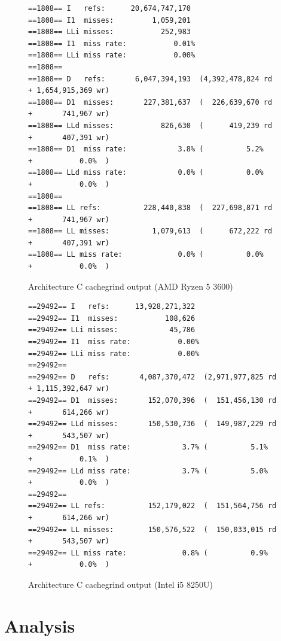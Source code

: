 \documentclass{article}
\begin{document}
\begin{figure}[!h]
\centering
\begin{BVerbatim}
==1808== I   refs:      20,674,747,170
==1808== I1  misses:         1,059,201
==1808== LLi misses:           252,983
==1808== I1  miss rate:           0.01%
==1808== LLi miss rate:           0.00%
==1808== 
==1808== D   refs:       6,047,394,193  (4,392,478,824 rd   + 1,654,915,369 wr)
==1808== D1  misses:       227,381,637  (  226,639,670 rd   +       741,967 wr)
==1808== LLd misses:           826,630  (      419,239 rd   +       407,391 wr)
==1808== D1  miss rate:            3.8% (          5.2%     +           0.0%  )
==1808== LLd miss rate:            0.0% (          0.0%     +           0.0%  )
==1808== 
==1808== LL refs:          228,440,838  (  227,698,871 rd   +       741,967 wr)
==1808== LL misses:          1,079,613  (      672,222 rd   +       407,391 wr)
==1808== LL miss rate:             0.0% (          0.0%     +           0.0%  )
\end{BVerbatim}
\caption{Architecture C cachegrind output (AMD Ryzen 5 3600)}
\label{arch_c_cachegrind_pc}
\end{figure}

\begin{figure}[!h]
\centering
\begin{BVerbatim}
==29492== I   refs:      13,928,271,322
==29492== I1  misses:           108,626
==29492== LLi misses:            45,786
==29492== I1  miss rate:           0.00%
==29492== LLi miss rate:           0.00%
==29492== 
==29492== D   refs:       4,087,370,472  (2,971,977,825 rd   + 1,115,392,647 wr)
==29492== D1  misses:       152,070,396  (  151,456,130 rd   +       614,266 wr)
==29492== LLd misses:       150,530,736  (  149,987,229 rd   +       543,507 wr)
==29492== D1  miss rate:            3.7% (          5.1%     +           0.1%  )
==29492== LLd miss rate:            3.7% (          5.0%     +           0.0%  )
==29492== 
==29492== LL refs:          152,179,022  (  151,564,756 rd   +       614,266 wr)
==29492== LL misses:        150,576,522  (  150,033,015 rd   +       543,507 wr)
==29492== LL miss rate:             0.8% (          0.9%     +           0.0%  )
\end{BVerbatim}
\caption{Architecture C cachegrind output (Intel i5 8250U)}
\label{arch_c_cachegrind_laptop}
\end{figure}

\clearpage

\section{Analysis}
\end{document}
